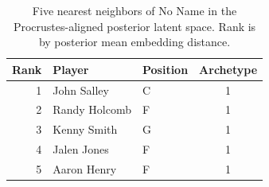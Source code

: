 \begin{table}[htbp]
  \centering\small
  \begin{tabular}{rllc}
    \toprule
    Rank & Player & Position & Archetype \\
    \midrule
    1 & John Salley & C & 1 \\
    2 & Randy Holcomb & F & 1 \\
    3 & Kenny Smith & G & 1 \\
    4 & Jalen Jones & F & 1 \\
    5 & Aaron Henry & F & 1 \\
    \bottomrule
  \end{tabular}
  \caption{Five nearest neighbors of No Name in the Procrustes-aligned posterior latent space. Rank is by posterior mean embedding distance.}
  \label{tab:No_Name_neighbors}
\end{table}

